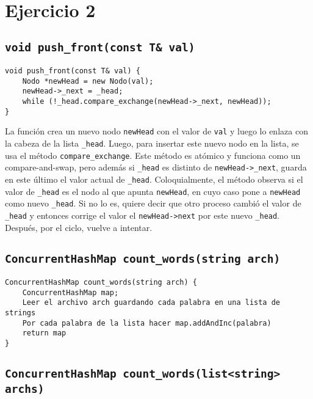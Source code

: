 \section{Ejercicio 2}


\subsection{\texttt{void push_front(const T& val)}}

\begin{verbatim}
void push_front(const T& val) {
	Nodo *newHead = new Nodo(val);
	newHead->_next = _head;
	while (!_head.compare_exchange(newHead->_next, newHead));
}
\end{verbatim}

La función crea un nuevo nodo \texttt{newHead} con el valor de \texttt{val} y luego lo enlaza con la cabeza de la lista \texttt{_head}. Luego, para insertar este nuevo nodo en la lista, se usa el método \texttt{compare_exchange}. Este método es atómico y funciona como un compare-and-swap, pero además si \texttt{_head} es distinto de \texttt{newHead->_next}, guarda en este último el valor actual de \texttt{_head}. Coloquialmente, el método observa si el valor de \texttt{_head} es el nodo al que apunta \texttt{newHead}, en cuyo caso pone a \texttt{newHead} como nuevo \texttt{_head}. Si no lo es, quiere decir que otro proceso cambió el valor de \texttt{_head} y entonces corrige el valor el \texttt{newHead->next} por este nuevo \texttt{_head}. Después, por el ciclo, vuelve a intentar.


\subsection{\texttt{ConcurrentHashMap count_words(string arch)}}

\begin{verbatim}
ConcurrentHashMap count_words(string arch) {
	ConcurrentHashMap map;
	Leer el archivo arch guardando cada palabra en una lista de strings
	Por cada palabra de la lista hacer map.addAndInc(palabra)
	return map
}
\end{verbatim}


\subsection{\texttt{ConcurrentHashMap count_words(list<string> archs)}}

